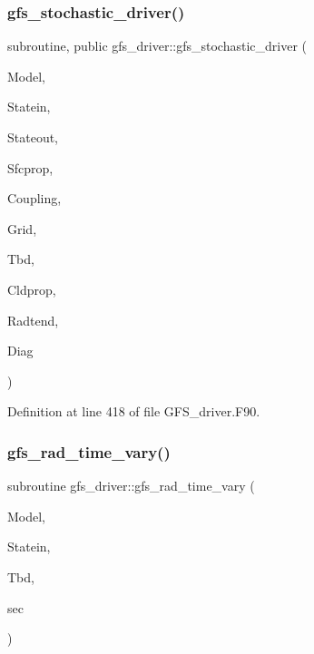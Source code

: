 \subsubsection{gfs\+\_\+stochastic\+\_\+driver()}
{\footnotesize\ttfamily subroutine, public gfs\+\_\+driver\+::gfs\+\_\+stochastic\+\_\+driver (\begin{DoxyParamCaption}\item[{type(gfs\+\_\+control\+\_\+type), intent(in)}]{Model,  }\item[{type(gfs\+\_\+statein\+\_\+type), intent(in)}]{Statein,  }\item[{type(gfs\+\_\+stateout\+\_\+type), intent(in)}]{Stateout,  }\item[{type(gfs\+\_\+sfcprop\+\_\+type), intent(in)}]{Sfcprop,  }\item[{type(gfs\+\_\+coupling\+\_\+type), intent(inout)}]{Coupling,  }\item[{type(gfs\+\_\+grid\+\_\+type), intent(in)}]{Grid,  }\item[{type(gfs\+\_\+tbd\+\_\+type), intent(in)}]{Tbd,  }\item[{type(gfs\+\_\+cldprop\+\_\+type), intent(in)}]{Cldprop,  }\item[{type(gfs\+\_\+radtend\+\_\+type), intent(in)}]{Radtend,  }\item[{type(gfs\+\_\+diag\+\_\+type), intent(inout)}]{Diag }\end{DoxyParamCaption})}



Definition at line 418 of file G\+F\+S\+\_\+driver.\+F90.

\mbox{\label{namespacegfs__driver_a1d85ae05ce74656622bac0724c16e47b}} 
\subsubsection{gfs\+\_\+rad\+\_\+time\+\_\+vary()}
{\footnotesize\ttfamily subroutine gfs\+\_\+driver\+::gfs\+\_\+rad\+\_\+time\+\_\+vary (\begin{DoxyParamCaption}\item[{type(gfs\+\_\+control\+\_\+type), intent(inout)}]{Model,  }\item[{type(gfs\+\_\+statein\+\_\+type), dimension(\+:), intent(in)}]{Statein,  }\item[{type(gfs\+\_\+tbd\+\_\+type), dimension(\+:), intent(inout)}]{Tbd,  }\item[{real(kind=kind\+\_\+phys), intent(in)}]{sec }\end{DoxyParamCaption})\hspace{0.3cm}{\ttfamily [private]}}



